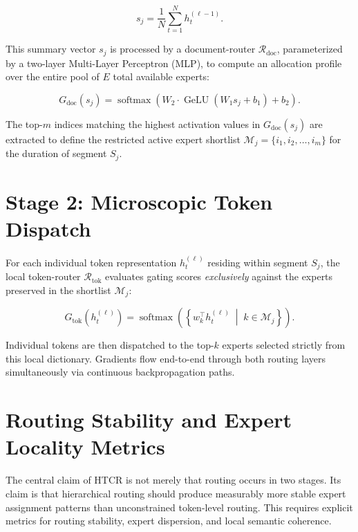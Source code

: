 \begin{equation}
s_j = \frac{1}{N}\sum_{t=1}^{N} h_t^{(\ell-1)}.
\end{equation}

This summary vector $s_j$ is processed by a document-router $\mathcal{R}_{\text{doc}}$, parameterized by a two-layer Multi-Layer Perceptron (MLP), to compute an allocation profile over the entire pool of $E$ total available experts:

\begin{equation}
G_{\text{doc}}(s_j) = \operatorname{softmax}\left(W_2 \cdot \operatorname{GeLU}\left(W_1 s_j + b_1\right) + b_2\right).
\end{equation}

The top-$m$ indices matching the highest activation values in $G_{\text{doc}}(s_j)$ are extracted to define the restricted active expert shortlist $\mathcal{M}_j = \{i_1, i_2, \dots, i_m\}$ for the duration of segment $S_j$.

\section{Stage 2: Microscopic Token Dispatch}
For each individual token representation $h_t^{(\ell)}$ residing within segment $S_j$, the local token-router $\mathcal{R}_{\text{tok}}$ evaluates gating scores \textit{exclusively} against the experts preserved in the shortlist $\mathcal{M}_j$:

\begin{equation}
G_{\text{tok}}\left(h_t^{(\ell)}\right) = \operatorname{softmax}\left( \left\{ w_k^{\top} h_t^{(\ell)} \;\middle|\; k \in \mathcal{M}_j \right\} \right).
\end{equation}

Individual tokens are then dispatched to the top-$k$ experts selected strictly from this local dictionary. Gradients flow end-to-end through both routing layers simultaneously via continuous backpropagation paths.

\section{Routing Stability and Expert Locality Metrics}

The central claim of HTCR is not merely that routing occurs in two stages. Its claim is that hierarchical routing should produce measurably more stable expert assignment patterns than unconstrained token-level routing. This requires explicit metrics for routing stability, expert dispersion, and local semantic coherence.

